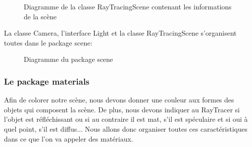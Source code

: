 \documentclass[11pt]{article}
\begin{document}
\begin{figure}[h!]
	
	\caption{Diagramme de la classe RayTracingScene contenant les informations de la scène}
	\label{diagrammeRayTracingScene}
\end{figure}
\FloatBarrier

La classe Camera, l'interface Light et la classe RayTracingScene s'organisent toutes dans le package scene:

\begin{figure}[h!]
	
	\caption{Diagramme du package scene}
	\label{diagrammePackageScene}
\end{figure}
\FloatBarrier

\subsubsection{Le package materials}

Afin de colorer notre scène, nous devons donner une couleur aux formes des objets qui composent la scène. De plus, nous devons indiquer au RayTracer si l'objet est réfléchissant ou si au contraire il est mat, s'il est spéculaire et si oui à quel point, s'il est diffus...
Nous allons donc organiser toutes ces caractéristiques dans ce que l'on va appeler des matériaux.
\end{document}
